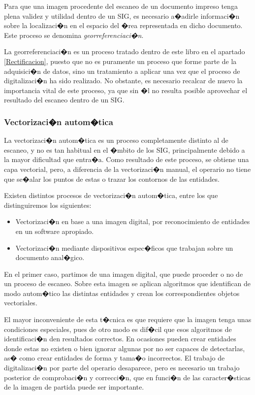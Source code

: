 Para que una imagen procedente del escaneo de un documento impreso tenga plena validez y utilidad dentro de un SIG, es necesario a�adirle informaci�n sobre la localizaci�n en el espacio del �rea representada en dicho documento. Este proceso se denomina \emph{georreferenciaci�n}.

La georreferenciaci�n es un proceso tratado dentro de este libro en el apartado \ref{Rectificacion}, puesto que no es puramente un proceso que forme parte de la adquisici�n de datos, sino un tratamiento a aplicar una vez que el proceso de digitalizaci�n ha sido realizado. No obstante, es necesario recalcar de nuevo la importancia vital de este proceso, ya que sin �l no resulta posible aprovechar el resultado del escaneo dentro de un SIG.

\subsubsection{Vectorizaci�n autom�tica}


La vectorizaci�n autom�tica es un proceso completamente distinto al de escaneo, y no es tan habitual en el �mbito de los SIG, principalmente debido a la mayor dificultad que entra�a. Como resultado de este proceso, se obtiene una capa vectorial, pero, a diferencia de la vectorizaci�n manual, el operario no tiene que se�alar los puntos de estas o trazar los contornos de las entidades.

Existen distintos procesos de vectorizaci�n autom�tica, entre los que distinguiremos los siguientes:

\begin{itemize}
	\item Vectorizaci�n en base a una imagen digital, por reconocimiento de entidades en un software apropiado.
	\item Vectorizaci�n mediante dispositivos espec�ficos que trabajan sobre un documento anal�gico.
\end{itemize}

En el primer caso, partimos de una imagen digital, que puede proceder o no de un proceso de escaneo. Sobre esta imagen se aplican algoritmos que identifican de modo autom�tico las distintas entidades y crean los correspondientes objetos vectoriales. 

El mayor inconveniente de esta t�cnica es que requiere que la imagen tenga unas condiciones especiales, pues de otro modo es dif�cil que esos algoritmos de identificaci�n den resultados correctos. En ocasiones pueden crear entidades donde estas no existen o bien ignorar algunas por no ser capaces de detectarlas, as� como crear entidades de forma y tama�o incorrectos. El trabajo de digitalizaci�n por parte del operario desaparece, pero es necesario un trabajo posterior de comprobaci�n y correcci�n, que en funci�n de las caracter�sticas de la imagen de partida puede ser importante.

